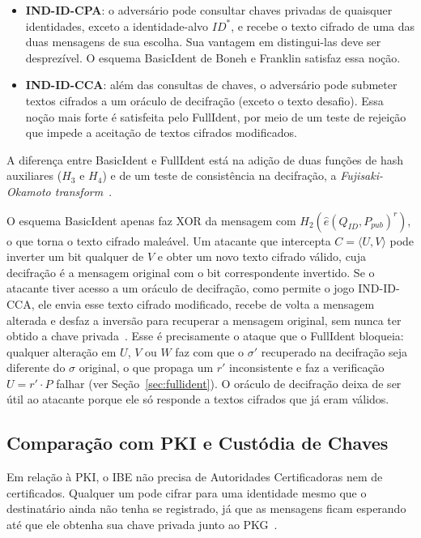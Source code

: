 \begin{itemize}
  \item \textbf{IND-ID-CPA}: o adversário pode consultar chaves privadas de quaisquer identidades,
    exceto a identidade-alvo $\mathit{ID}^*$, e recebe o texto cifrado de uma das duas mensagens de
    sua escolha. Sua vantagem em distingui-las deve ser desprezível. O esquema BasicIdent de Boneh
    e Franklin satisfaz essa noção.

  \item \textbf{IND-ID-CCA}: além das consultas de chaves, o adversário pode submeter textos cifrados a
    um oráculo de decifração (exceto o texto desafio). Essa noção mais forte é satisfeita pelo
    FullIdent, por meio de um teste de rejeição que impede a aceitação de textos cifrados modificados.
\end{itemize}

A diferença entre BasicIdent e FullIdent está na adição de duas funções de hash auxiliares
($H_3$ e $H_4$) e de um teste de consistência na decifração, a \textit{Fujisaki-Okamoto
transform}~\cite{fujisaki1999secure,boneh2001ibe}.

O esquema BasicIdent apenas faz XOR da mensagem com $H_2(\hat{e}(Q_{\mathit{ID}},
P_{\mathit{pub}})^r)$, o que torna o texto cifrado maleável. Um atacante que intercepta
$C = \langle U, V \rangle$ pode inverter um bit qualquer de $V$ e obter um novo texto cifrado
válido, cuja decifração é a mensagem original com o bit correspondente invertido. Se o
atacante tiver acesso a um oráculo de decifração, como permite o jogo IND-ID-CCA, ele envia
esse texto cifrado modificado, recebe de volta a mensagem alterada e desfaz a inversão para
recuperar a mensagem original, sem nunca ter obtido a chave privada~\cite{menezes2009intro}.
Esse é precisamente o ataque que o FullIdent bloqueia: qualquer alteração em $U$, $V$ ou $W$
faz com que o $\sigma'$ recuperado na decifração seja diferente do $\sigma$ original, o que
propaga um $r'$ inconsistente e faz a verificação $U = r' \cdot P$ falhar (ver
Seção~\ref{sec:fullident}). O oráculo de decifração deixa de ser útil ao atacante porque ele só
responde a textos cifrados que já eram válidos.

\subsection{Comparação com PKI e Custódia de Chaves}

Em relação à PKI, o IBE não precisa de Autoridades Certificadoras nem
de certificados. Qualquer um pode cifrar para uma identidade mesmo que o destinatário ainda não
tenha se registrado, já que as mensagens ficam esperando até que ele obtenha sua chave
privada junto ao PKG~\cite{franklin2008nist}.

